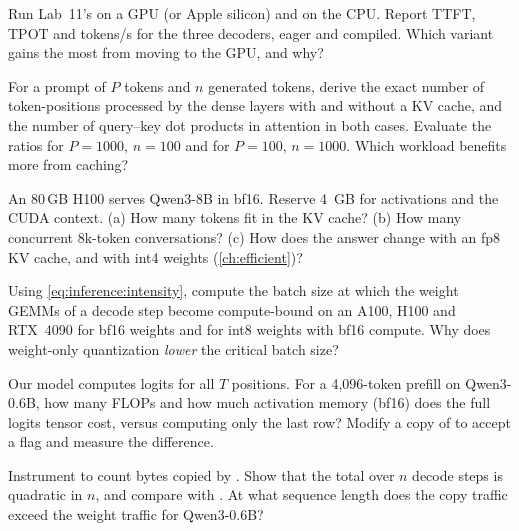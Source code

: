 \begin{exercise}
Run Lab~11's  on a GPU (or Apple silicon) and on the CPU. Report TTFT, TPOT and
tokens/s for the three decoders, eager and compiled. Which variant gains the most from moving to
the GPU, and why?
\end{exercise}

\begin{exercise}
For a prompt of $P$ tokens and $n$ generated tokens, derive the exact number of token-positions
processed by the dense layers with and without a KV cache, and the number of query--key dot
products in attention in both cases. Evaluate the ratios for $P=1000$, $n=100$ and for $P=100$,
$n=1000$. Which workload benefits more from caching?
\end{exercise}

\begin{exercise}
An 80\,GB H100 serves Qwen3-8B in bf16. Reserve \SI{4}{GB} for activations and the CUDA context.
(a) How many tokens fit in the KV cache? (b) How many concurrent 8k-token conversations? (c) How
does the answer change with an fp8 KV cache, and with int4 weights (\cref{ch:efficient})?
\end{exercise}

\begin{exercise}
Using \cref{eq:inference:intensity}, compute the batch size at which the weight GEMMs of a decode
step become compute-bound on an A100, H100 and RTX~4090 for bf16 weights and for int8 weights with
bf16 compute. Why does weight-only quantization \emph{lower} the critical batch size?
\end{exercise}

\begin{exercise}
Our model computes logits for all $T$ positions. For a 4,096-token prefill on Qwen3-0.6B, how many
FLOPs and how much activation memory (bf16) does the full logits tensor cost, versus computing only
the last row? Modify a copy of  to accept a  flag and
measure the difference.
\end{exercise}

\begin{exercise}
Instrument  to count bytes copied by . Show that the total over
$n$ decode steps is quadratic in $n$, and compare with . At what sequence length
does the copy traffic exceed the weight traffic for Qwen3-0.6B?
\end{exercise}

